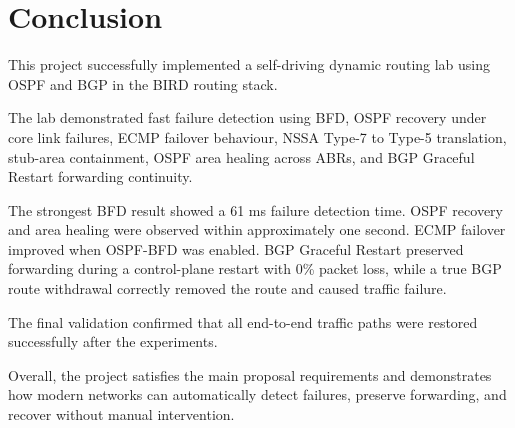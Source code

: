 \documentclass[12pt,a4paper]{article}
\begin{document}
\section{Conclusion}

This project successfully implemented a self-driving dynamic routing lab using OSPF and BGP in the BIRD routing stack.

The lab demonstrated fast failure detection using BFD, OSPF recovery under core link failures, ECMP failover behaviour, NSSA Type-7 to Type-5 translation, stub-area containment, OSPF area healing across ABRs, and BGP Graceful Restart forwarding continuity.

The strongest BFD result showed a 61 ms failure detection time. OSPF recovery and area healing were observed within approximately one second. ECMP failover improved when OSPF-BFD was enabled. BGP Graceful Restart preserved forwarding during a control-plane restart with 0\% packet loss, while a true BGP route withdrawal correctly removed the route and caused traffic failure.

The final validation confirmed that all end-to-end traffic paths were restored successfully after the experiments.

Overall, the project satisfies the main proposal requirements and demonstrates how modern networks can automatically detect failures, preserve forwarding, and recover without manual intervention.


\clearpage

\end{document}
